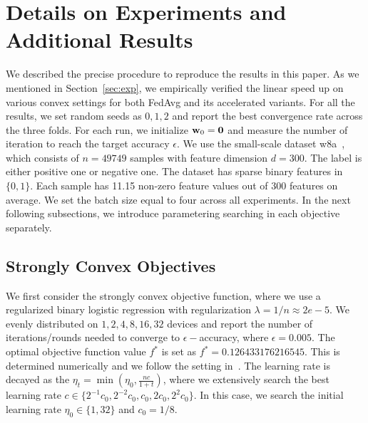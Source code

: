 
\section{Details on Experiments and Additional Results}
\label{sec:expsupp}

We described the precise procedure to reproduce the results in this paper.
As we mentioned in Section~\ref{sec:exp}, we empirically verified the
linear speed up on various convex settings for both FedAvg and its
accelerated variants. For all the results, we set random seeds as $0, 1, 2$
and report the best convergence rate across the three folds. For each
run, we initialize ${\mathbf{w}}_0 = \mathbf{0}$ and measure the number of iteration
to reach the target accuracy $\epsilon$. We use the small-scale dataset
w8a~\cite{platt1998fast}, which consists of $n = 49749 $ samples with
feature dimension $d = 300$. The label is either positive one or negative one.
The dataset has sparse binary features in $\{0, 1\}$. Each sample
has 11.15 non-zero feature values out of $300$ features on average.
We set the batch size equal to four across all experiments.
In the next following subsections,
we introduce parametering searching in each objective separately.


\subsection{Strongly Convex Objectives}
We first consider the strongly convex objective function, where we use
a regularized binary logistic regression with regularization $\lambda=1/n\approx 2e-5$. We evenly distributed on $1, 2, 4, 8, 16, 32$ devices and  report the number of iterations/rounds needed to converge to $\epsilon-$accuracy, where $\epsilon=0.005$. The optimal objective function value $f^*$
is set as $f^* = 0.126433176216545$. This is determined numerically and we follow the setting in~\cite{stich2018local}. The learning rate is decayed as the $\eta_t = \min(\eta_0, \frac{nc}{1 + t})$, where we extensively search the best learning rate $c \in \{2^{-1}c_0, 2^{-2}c_0, c_0, 2c_0, 2^{2}c_0\}$. In this case, we search the initial learning rate $\eta_0\in \{1, 32\}$ and $c_0 = 1/8$.


